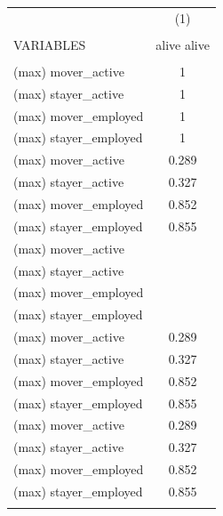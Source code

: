 \begin{tabular}{lc} \hline
 & (1) \\
 &  \\
VARIABLES & alive alive \\ \hline
 &  \\
(max) mover\_active & 1 \\
(max) stayer\_active & 1 \\
(max) mover\_employed & 1 \\
(max) stayer\_employed & 1 \\
(max) mover\_active & 0.289 \\
(max) stayer\_active & 0.327 \\
(max) mover\_employed & 0.852 \\
(max) stayer\_employed & 0.855 \\
(max) mover\_active &  \\
(max) stayer\_active &  \\
(max) mover\_employed &  \\
(max) stayer\_employed &  \\
(max) mover\_active & 0.289 \\
(max) stayer\_active & 0.327 \\
(max) mover\_employed & 0.852 \\
(max) stayer\_employed & 0.855 \\
(max) mover\_active & 0.289 \\
(max) stayer\_active & 0.327 \\
(max) mover\_employed & 0.852 \\
(max) stayer\_employed & 0.855 \\
 &  \\ \hline
\end{tabular}

